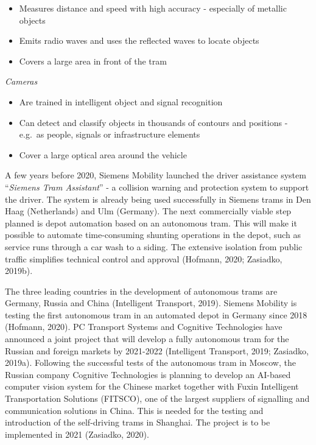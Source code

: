 \documentclass[
]{book}
\providecommand{\tightlist}{%
  \setlength{\itemsep}{0pt}\setlength{\parskip}{0pt}}
\begin{document}
\begin{itemize}
\tightlist
\item
  Measures distance and speed with high accuracy - especially of metallic objects
\item
  Emits radio waves and uses the reflected waves to locate objects
\item
  Covers a large area in front of the tram
\end{itemize}

\emph{Cameras}

\begin{itemize}
\tightlist
\item
  Are trained in intelligent object and signal recognition
\item
  Can detect and classify objects in thousands of contours and positions - e.g.~as people, signals or infrastructure elements
\item
  Cover a large optical area around the vehicle
\end{itemize}

A few years before 2020, Siemens Mobility launched the driver assistance system ``\emph{Siemens Tram Assistant}'' - a collision warning and protection system to support the driver. The system is already being used successfully in Siemens trams in Den Haag (Netherlands) and Ulm (Germany). The next commercially viable step planned is depot automation based on an autonomous tram. This will make it possible to automate time-consuming shunting operations in the depot, such as service runs through a car wash to a siding. The extensive isolation from public traffic simplifies technical control and approval (Hofmann, 2020; Zasiadko, 2019b).

The three leading countries in the development of autonomous trams are Germany, Russia and China (Intelligent Transport, 2019). Siemens Mobility is testing the first autonomous tram in an automated depot in Germany since 2018 (Hofmann, 2020). PC Transport Systems and Cognitive Technologies have announced a joint project that will develop a fully autonomous tram for the Russian and foreign markets by 2021-2022 (Intelligent Transport, 2019; Zasiadko, 2019a). Following the successful tests of the autonomous tram in Moscow, the Russian company Cognitive Technologies is planning to develop an AI-based computer vision system for the Chinese market together with Fuxin Intelligent Transportation Solutions (FITSCO), one of the largest suppliers of signalling and communication solutions in China. This is needed for the testing and introduction of the self-driving trams in Shanghai. The project is to be implemented in 2021 (Zasiadko, 2020).
\end{document}
